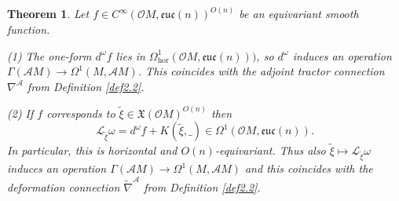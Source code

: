 \documentclass[12pt,a4paper]{amsart}
\def\frak{\mathfrak}
\def\Cal{\mathcal}
\newcommand{\om}{\omega}
\newcommand{\Ga}{\Gamma}
\newcommand{\Om}{\Omega}
\newcommand{\euc}{\mathfrak{euc}}
\newcommand{\tn}{\widetilde{\nabla}}
\newcommand{\hor}{\text{hor}}
\newcounter{theorem}
\numberwithin{theorem}{section}
\numberwithin{equation}{section}
\newtheorem{thm}[theorem]{Theorem}
\theoremstyle{definition}
\theoremstyle{remark}
\begin{document}
\begin{thm}\label{thm3.3}
  Let $f\in C^{\infty}(\Cal OM,\euc(n))^{O(n)}$ be an equivariant smooth function.
  
  (1) The one-form $d^\om f$ lies in $\Om^1_{\hor}(\Cal OM,\euc(n)))$, so $d^\om$
  induces an operation $\Ga(\Cal AM)\to\Om^1(M,\Cal AM)$. This coincides with the
  adjoint tractor connection $\nabla^{\Cal A}$ from Definition \ref{def2.2}.

  (2) If $f$ corresponds to $\tilde\xi\in\frak X(\Cal OM)^{O(n)}$ then
  $$
  \Cal L_{\tilde\xi}\om = d^\om f+K(\tilde\xi,\_)\in \Om^1(\Cal OM,\euc(n)).  
  $$ In particular, this is horizontal and $O(n)$-equivariant. Thus also
  $\tilde\xi\mapsto \Cal L_{\tilde\xi}\om$ induces an operation $\Ga(\Cal
  AM)\to\Om^1(M,\Cal AM)$ and this coincides with the deformation connection
  $\tn^{\Cal A}$ from Definition \ref{def2.2}.
\end{thm}
\end{document}
